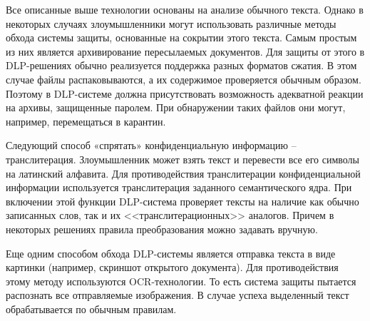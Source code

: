 Все описанные выше технологии основаны на анализе обычного текста. Однако в некоторых случаях злоумышленники могут использовать различные методы обхода системы защиты, основанные на сокрытии этого текста. Самым простым из них является архивирование пересылаемых документов. Для защиты от этого в DLP-решениях обычно реализуется поддержка разных форматов сжатия. В этом случае файлы распаковываются, а их содержимое проверяется обычным образом. Поэтому в DLP-системе должна присутствовать возможность адекватной реакции на архивы, защищенные паролем. При обнаружении таких файлов они могут, например, перемещаться в карантин.

Следующий способ «спрятать» конфиденциальную информацию – транслитерация. Злоумышленник может взять текст и перевести все его символы на латинский алфавита. Для противодействия транслитерации конфиденциальной информации используется транслитерация заданного семантического ядра. При включении этой функции DLP-система проверяет тексты на наличие как обычно записанных слов, так и их <<транслитерационных>> аналогов. Причем в некоторых решениях правила преобразования можно задавать вручную.

Еще одним способом обхода DLP-системы является отправка текста в виде картинки (например, скриншот открытого документа). Для противодействия этому методу используются OCR-технологии. То есть система защиты пытается распознать все отправляемые изображения. В случае успеха выделенный текст обрабатывается по обычным правилам.
